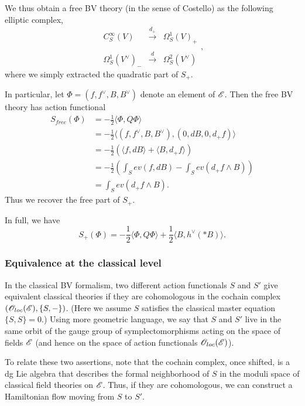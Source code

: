 We thus obtain a free BV theory (in the sense of Costello) as the following elliptic complex,
\[
\begin{array}{ccc}
C^\infty_S(V) & \overset{d_+}{\rightarrow} &\Omega^1_S(V)_+\\
& &  \\
\Omega^1_S(V^\vee)_-& \overset{d}{\rightarrow} & \Omega^2_S(V^\vee)
\end{array},
\]
where we simply extracted the quadratic part of $S_+$.

In particular, let $\Phi = (f, f^\vee, B, B^\vee)$ denote an element of $\mathscr E$. Then the free BV theory has action functional
\begin{align*}
S_{free}(\Phi) &= -\frac{1}{2}\langle \Phi, Q \Phi\rangle \\
&= -\frac{1}{2}\langle (f, f^\vee, B, B^\vee), (0, dB, 0, d_+ f)\rangle \\
&= -\frac{1}{2} \left( \langle f, dB \rangle + \langle B,d_+f\rangle \right)\\
&= -\frac{1}{2} \left(\int_S ev(f, dB) - \int_S ev(d_+f \wedge B) \right)\\
&= \int_S ev(d_+f \wedge B).
\end{align*}
Thus we recover the free part of $S_+$.

In full, we have
\[
S_+(\Phi) = - \frac{1}{2}\langle \Phi, Q \Phi\rangle + \frac{1}{2} \langle B, h^\vee (\ast B) \rangle.
\]

\subsubsection{Equivalence at the classical level}

In the classical BV formalism, two different action functionals $S$ and $S'$ give equivalent classical theories if they are cohomologous in the cochain complex $(\mathscr O_{loc}(\mathscr E), \{S,-\})$. (Here we assume $S$ satisfies the classical master equation $\{S,S\} = 0$.) Using more geometric language, we say that $S$ and $S'$ live in the same orbit of the gauge group of symplectomorphisms acting on the space of fields $\mathscr E$ (and hence on the space of action functionals $\mathscr O_{loc}(\mathscr E)$).

\begin{rmk} 
To relate these two assertions, note that the cochain complex, once shifted, is a dg Lie algebra that describes the formal neighborhood of $S$ in the moduli space of classical field theories on $\mathscr E$. Thus, if they are cohomologous, we can construct a Hamiltonian flow moving from $S$ to $S'$.
\end{rmk}

